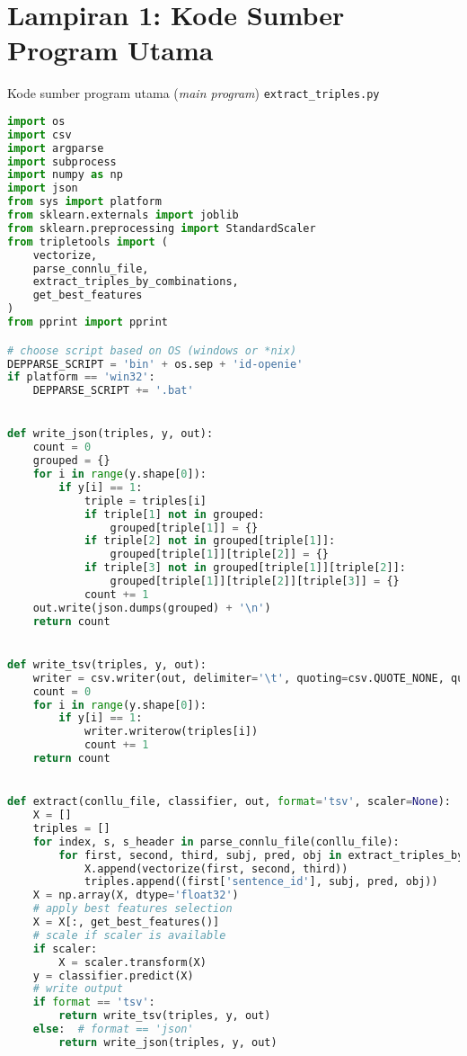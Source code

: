 
\chapter*{Lampiran 1: Kode Sumber Program Utama}

Kode sumber program utama (\textit{main program}) \verb|extract_triples.py|

\begin{lstlisting}[language=Python]
import os
import csv
import argparse
import subprocess
import numpy as np
import json
from sys import platform
from sklearn.externals import joblib
from sklearn.preprocessing import StandardScaler
from tripletools import (
    vectorize,
    parse_connlu_file,
    extract_triples_by_combinations,
    get_best_features
)
from pprint import pprint

# choose script based on OS (windows or *nix)
DEPPARSE_SCRIPT = 'bin' + os.sep + 'id-openie'
if platform == 'win32':
    DEPPARSE_SCRIPT += '.bat'


def write_json(triples, y, out):
    count = 0
    grouped = {}
    for i in range(y.shape[0]):
        if y[i] == 1:
            triple = triples[i]
            if triple[1] not in grouped:
                grouped[triple[1]] = {}
            if triple[2] not in grouped[triple[1]]:
                grouped[triple[1]][triple[2]] = {}
            if triple[3] not in grouped[triple[1]][triple[2]]:
                grouped[triple[1]][triple[2]][triple[3]] = {}
            count += 1
    out.write(json.dumps(grouped) + '\n')
    return count


def write_tsv(triples, y, out):
    writer = csv.writer(out, delimiter='\t', quoting=csv.QUOTE_NONE, quotechar='')
    count = 0
    for i in range(y.shape[0]):
        if y[i] == 1:
            writer.writerow(triples[i])
            count += 1
    return count


def extract(conllu_file, classifier, out, format='tsv', scaler=None):
    X = []
    triples = []
    for index, s, s_header in parse_connlu_file(conllu_file):
        for first, second, third, subj, pred, obj in extract_triples_by_combinations(s, s_header):
            X.append(vectorize(first, second, third))
            triples.append((first['sentence_id'], subj, pred, obj))
    X = np.array(X, dtype='float32')
    # apply best features selection
    X = X[:, get_best_features()]
    # scale if scaler is available
    if scaler:
        X = scaler.transform(X)
    y = classifier.predict(X)
    # write output
    if format == 'tsv':
        return write_tsv(triples, y, out)
    else:  # format == 'json'
        return write_json(triples, y, out)



\end{lstlisting}
